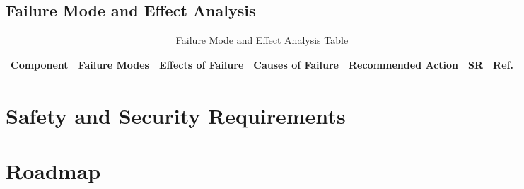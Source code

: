 \documentclass{article}
\begin{document}
\newpage
\begin{landscape}
	\section{Failure Mode and Effect Analysis}
	\begin{table}[H]
		\centering
		\caption{Failure Mode and Effect Analysis Table}
		\begin{adjustbox}{width=\paperwidth}
			\begin{tabular}{c|c|c|c|c|c|c}
				\hline
				\textbf{Component} & \textbf{Failure Modes} & \textbf{Effects of Failure} & \textbf{Causes of Failure} & \textbf{Recommended Action} & \textbf{SR} & \textbf{Ref.} \\
				\hline
			\end{tabular}
		\end{adjustbox}
	\end{table}
\end{landscape}

\section{Safety and Security Requirements}


\section{Roadmap}

\end{document}
